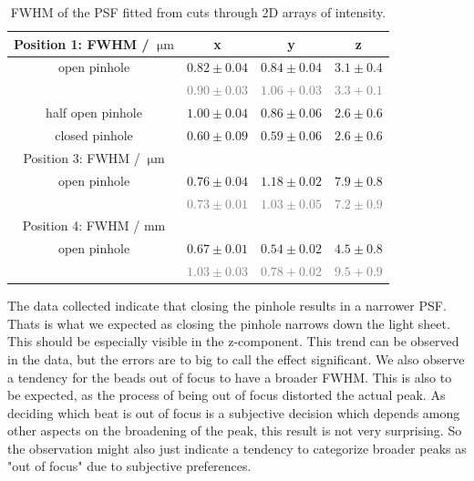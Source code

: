 \begin{table}[ht]
    \centering
    \begin{tabular}{cccc}
        \toprule Position 1: FWHM / $\SI{}{\micro \meter}$ & \textbf{x} &\textbf{y} & \textbf{z} \\
        \hline\hline open pinhole & $0.82\pm0.04$ & $0.84\pm0.04$ &  $3.1\pm0.4$ \\
        & \textcolor{gray}{$0.90\pm0.03$} & \textcolor{gray}{$1.06+0.03$} & \textcolor{gray}{$3.3+0.1$}\\
        half open pinhole & $1.00 \pm0.04$ &$ 0.86\pm0.06 $& $2.6\pm0.6$ \\
        closed pinhole & $0.60 \pm 0.09$ & $0.59 \pm 0.06$ & $2.6\pm0.6$ \\
        \hline Position 3: FWHM / $\SI{}{\micro \meter}$  & & &  \\
        \hline open pinhole & $0.76\pm0.04$ & $ 1.18\pm0.02$ & $7.9\pm0.8$ \\
        & \textcolor{gray}{$0.73\pm0.01$} & \textcolor{gray}{$1.03\pm0.05$} & \textcolor{gray}{$7.2\pm0.9$}\\
        \hline Position 4: FWHM / $\mathrm{mm}$  & & &  \\
        \hline open pinhole & $0.67\pm0.01$ & $0.54 \pm 0.02$ & $4.5\pm 0.8$ \\
        & \textcolor{gray}{$1.03\pm0.03$} & \textcolor{gray}{$0.78+0.02$} & \textcolor{gray}{$9.5+0.9$}\\
        \bottomrule
    \end{tabular}
    \caption{FWHM of the PSF fitted from cuts through 2D arrays of intensity. }
    \label{tab:FWHM}
\end{table}

The data collected indicate that closing the pinhole results in a narrower PSF. Thats is what we expected as closing the pinhole narrows down the light sheet. This should be especially visible in the z-component. This trend can be observed in the data, but the errors are to big to call the effect significant. 
We also observe a tendency for the beads out of focus to have a broader FWHM. This is also to be expected, as the 
process of being out of focus distorted the actual peak. As deciding which beat is out of focus is a 
subjective decision which depends among other aspects on the broadening of the peak, this result is not very surprising.
So the observation might also just indicate a tendency to categorize broader peaks as "out of focus" due to subjective preferences.

